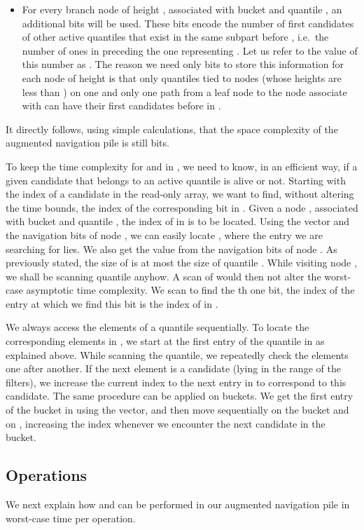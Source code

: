 \documentclass[final,onetabnum,onefignum,onethmnum]{siamltex}
\newcommand{\Insert}{\mbox{}}
\newcommand{\Extract}{\mbox{}}
\begin{document}
\begin{itemize}
\item For every branch node of height , associated with bucket  and
  quantile , an additional  bits
  will be used. These bits encode the number of first candidates
  of other active quantiles that exist in the same subpart
   before , 
  i.e.~the number of ones in 
  preceding the one representing . 
  Let us refer to the value of this number as .  
	The reason we need only  bits to store this
  information for each node of height  is that only quantiles tied
  to nodes (whose heights are less than ) on one and only one path
  from a leaf node to the node associate with  can have their first candidates
  before  in .
\end{itemize}

It directly follows, using simple calculations, that the space
complexity of the augmented navigation pile is still  bits. 

To keep the time complexity for \Insert{} and \Extract{} in , we need to know, in an efficient way, if a given candidate that
belongs to an active quantile is alive or not.  Starting with the
index of a candidate in the read-only array, we want to find, without
altering the time bounds, the index of the corresponding bit in .
Given a node , associated with bucket  and quantile ,
the index of  in
 is to be located. Using the  vector
and the navigation bits of node , we can easily locate
, where the entry we are searching for
lies. We also get the value  from the
navigation bits of node . As previously stated, the size of
 is at most the size of quantile . While
visiting node , we shall be scanning quantile  anyhow. A scan of
 would then not alter the worst-case
asymptotic time complexity. We scan  to find
the th one bit, the index of the entry at which we find this bit is
the index of  in .

We always access the elements of a quantile
sequentially. To locate the corresponding elements in
, we start at the first entry of the quantile in
 as explained above. While
scanning the quantile, we repeatedly check the elements one after
another. If the next element is a candidate (lying in the range of the
filters), we increase the current index to the next entry in
 to correspond to this candidate.  The same procedure
can be applied on buckets. We get the first entry of the bucket
in  using the  vector, and then move
sequentially on the bucket and on , increasing the
 index whenever we encounter the next candidate in the bucket.

\subsection{Operations} 
We next explain how \Insert{} and \Extract{} can be performed in our
augmented navigation pile in   worst-case time per operation.
\end{document}
